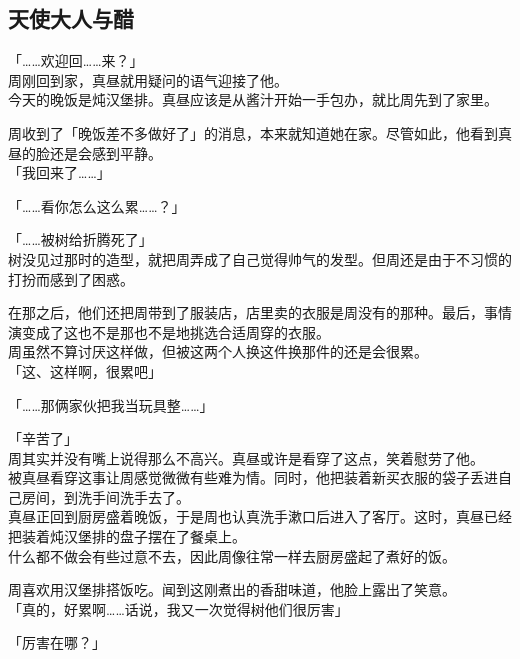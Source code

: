 \subsection{天使大人与醋}

「……欢迎回……来？」\\

周刚回到家，真昼就用疑问的语气迎接了他。\\

今天的晚饭是炖汉堡排。真昼应该是从酱汁开始一手包办，就比周先到了家里。

周收到了「晚饭差不多做好了」的消息，本来就知道她在家。尽管如此，他看到真昼的脸还是会感到平静。\\

「我回来了……」

「……看你怎么这么累……？」

「……被树给折腾死了」\\

树没见过那时的造型，就把周弄成了自己觉得帅气的发型。但周还是由于不习惯的打扮而感到了困惑。

在那之后，他们还把周带到了服装店，店里卖的衣服是周没有的那种。最后，事情演变成了这也不是那也不是地挑选合适周穿的衣服。\\

周虽然不算讨厌这样做，但被这两个人换这件换那件的还是会很累。\\

「这、这样啊，很累吧」

「……那俩家伙把我当玩具整……」

「辛苦了」\\

周其实并没有嘴上说得那么不高兴。真昼或许是看穿了这点，笑着慰劳了他。\\

被真昼看穿这事让周感觉微微有些难为情。同时，他把装着新买衣服的袋子丢进自己房间，到洗手间洗手去了。\\

真昼正回到厨房盛着晚饭，于是周也认真洗手漱口后进入了客厅。这时，真昼已经把装着炖汉堡排的盘子摆在了餐桌上。\\

什么都不做会有些过意不去，因此周像往常一样去厨房盛起了煮好的饭。

周喜欢用汉堡排搭饭吃。闻到这刚煮出的香甜味道，他脸上露出了笑意。\\

「真的，好累啊……话说，我又一次觉得树他们很厉害」

「厉害在哪？」\\

